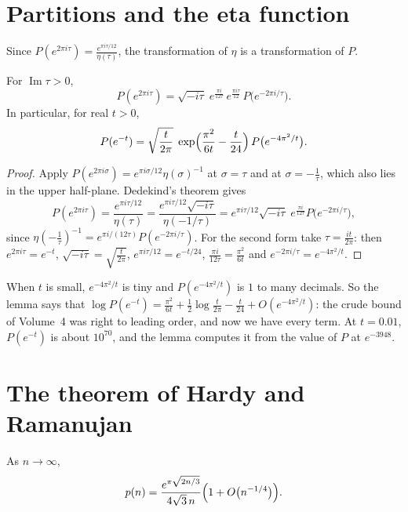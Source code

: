 \section{Partitions and the eta function}

Since $P(e^{2\pi i\tau})=\frac{e^{\pi i\tau/12}}{\eta(\tau)}$, the transformation of $\eta$ is a transformation of $P$.

\begin{lemma}\label{lem:ptrans}
For $\operatorname{Im}\tau>0$,
\[
P(e^{2\pi i\tau})=\sqrt{-i\tau}\;e^{\frac{\pi i}{12\tau}}\,e^{\frac{\pi i\tau}{12}}\,P\bigl(e^{-2\pi i/\tau}\bigr).
\]
In particular, for real $t>0$,
\[
P(e^{-t})=\sqrt{\frac t{2\pi}}\;\exp\Bigl(\frac{\pi^2}{6t}-\frac t{24}\Bigr)\,P\bigl(e^{-4\pi^2/t}\bigr).
\]
\end{lemma}
\begin{proof}
Apply $P(e^{2\pi i\sigma})=e^{\pi i\sigma/12}\eta(\sigma)^{-1}$ at $\sigma=\tau$ and at $\sigma=-\frac1\tau$, which also lies in the upper half-plane. Dedekind's theorem gives
\[
P(e^{2\pi i\tau})=\frac{e^{\pi i\tau/12}}{\eta(\tau)}=\frac{e^{\pi i\tau/12}\sqrt{-i\tau}}{\eta(-1/\tau)}=e^{\pi i\tau/12}\sqrt{-i\tau}\;e^{\frac{\pi i}{12\tau}}P\bigl(e^{-2\pi i/\tau}\bigr),
\]
since $\eta(-\frac1\tau)^{-1}=e^{\pi i/(12\tau)}P(e^{-2\pi i/\tau})$. For the second form take $\tau=\frac{it}{2\pi}$: then $e^{2\pi i\tau}=e^{-t}$, $\sqrt{-i\tau}=\sqrt{\frac t{2\pi}}$, $e^{\pi i\tau/12}=e^{-t/24}$, $\frac{\pi i}{12\tau}=\frac{\pi^2}{6t}$ and $e^{-2\pi i/\tau}=e^{-4\pi^2/t}$.
\end{proof}

When $t$ is small, $e^{-4\pi^2/t}$ is tiny and $P(e^{-4\pi^2/t})$ is $1$ to many decimals. So the lemma says that $\log P(e^{-t})=\frac{\pi^2}{6t}+\frac12\log\frac t{2\pi}-\frac t{24}+O(e^{-4\pi^2/t})$: the crude bound of Volume~4 was right to leading order, and now we have every term. At $t=0.01$, $P(e^{-t})$ is about $10^{70}$, and the lemma computes it from the value of $P$ at $e^{-3948}$.

\section{The theorem of Hardy and Ramanujan}

\begin{theorem}\label{thm:hr}
As $n\to\infty$,
\[
p(n)=\frac{e^{\pi\sqrt{2n/3}}}{4\sqrt3\,n}\Bigl(1+O\bigl(n^{-1/4}\bigr)\Bigr).
\]
\end{theorem}


